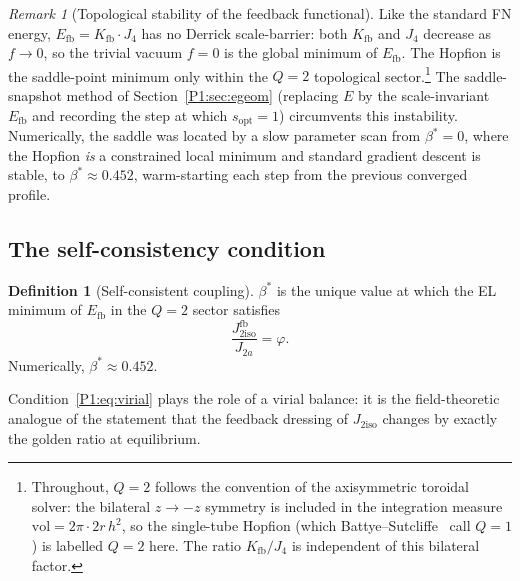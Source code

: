 \documentclass[11pt,a4paper]{article}
\theoremstyle{definition}
\newtheorem{definition}[theorem]{Definition}
\theoremstyle{remark}
\newtheorem{remark}[theorem]{Remark}
\newcommand{\vp}{\varphi}
\newcommand{\bst}{\beta^{*}}
\newcommand{\Kfb}{K_{\mathrm{fb}}}
\newcommand{\Efb}{E_{\mathrm{fb}}}
\newcommand{\Jfb}{J_{2\mathrm{iso}}^{\mathrm{fb}}}
\newcommand{\Ja}{J_{2a}}
\newcommand{\Jiso}{J_{2\mathrm{iso}}}
\newcommand{\Jfour}{J_{4}}
\newcommand{\sopt}{s_{\mathrm{opt}}}
\begin{document}
\begin{remark}[Topological stability of the feedback functional]
\label{P1:rem:stability}
Like the standard FN energy, $\Efb = \Kfb\cdot\Jfour$ has no
Derrick scale-barrier: both $\Kfb$ and $\Jfour$ decrease as $f\to 0$,
so the trivial vacuum $f=0$ is the global minimum of $\Efb$.  The
Hopfion is the saddle-point minimum only within the $Q=2$ topological
sector.\footnote{Throughout, $Q=2$ follows the convention of the axisymmetric
toroidal solver: the bilateral $z\to-z$ symmetry is included in the
integration measure $\mathrm{vol}=2\pi\cdot 2r\,h^2$, so the single-tube
Hopfion (which Battye--Sutcliffe~\cite{Battye1998} call $Q=1$) is labelled $Q=2$ here.
The ratio $\Kfb/\Jfour$ is independent of this bilateral factor.}  The saddle-snapshot method of Section~\ref{P1:sec:egeom}
(replacing $E$ by the scale-invariant $\Efb$ and recording the step at
which $\sopt=1$) circumvents this instability.  Numerically, the saddle
was located by a slow parameter scan from $\bst=0$,  where the
Hopfion \emph{is} a constrained local minimum and standard gradient
descent is stable,  to $\bst\approx 0.452$, warm-starting each step
from the previous converged profile.
\end{remark}

\subsection{The self-consistency condition}

\begin{definition}[Self-consistent coupling]
\label{P1:def:bstar}
$\bst$ is the unique value at which the EL minimum of $\Efb$ in the
$Q=2$ sector satisfies
\begin{equation}
  \frac{\Jfb}{\Ja} = \vp.
  \label{P1:eq:virial}
\end{equation}
Numerically, $\bst \approx 0.452$.
\end{definition}

Condition~\eqref{P1:eq:virial} plays the role of a virial balance: it is the
field-theoretic analogue of the statement that the feedback dressing of
$\Jiso$ changes by exactly the golden ratio at equilibrium.
\end{document}
